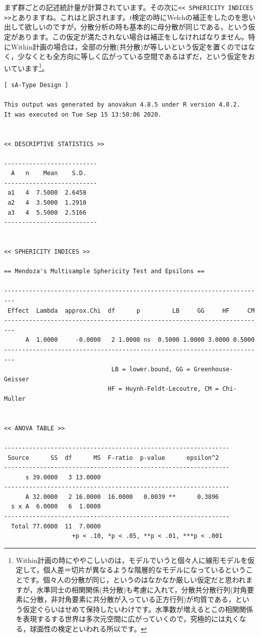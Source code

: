 \documentclass{ltjsarticle}
\begin{document}
まず群ごとの記述統計量が計算されています。その次に\verb|<< SPHERICITY INDICES >>|とありますね。これはと訳されます。$t$検定の時にWelchの補正をしたのを思い出して欲しいのですが，分散分析の時も基本的に母分散が同じである，という仮定があります。この仮定が満たされない場合は補正をしなければなりません。特にWithin計画の場合は，全部の分散(共分散)が等しいという仮定を置くのではなく，少なくとも全方向に等しく広がっている空間であるはずだ，という仮定をおいています\footnote{Within計画の時にややこしいのは，モデルでいうと個々人に線形モデルを仮定して，個人差＝切片が異なるような階層的なモデルになっているということです。個々人の分散が同じ，というのはなかなか厳しい仮定だと思われますが，水準同士の相関関係(共分散)も考慮に入れて，分散共分散行列(対角要素に分散，非対角要素に共分散が入っている正方行列)が均質である，という仮定ぐらいはせめて保持したいわけです。水準数が増えるとこの相関関係を表現するする世界は多次元空間に広がっていくので，究極的には丸くなる，球面性の検定といわれる所以です。 }。
\begin{tcolorbox}
\begin{verbatim}
[ sA-Type Design ]

This output was generated by anovakun 4.8.5 under R version 4.0.2.
It was executed on Tue Sep 15 13:50:06 2020.

 
<< DESCRIPTIVE STATISTICS >>

--------------------------
  A   n    Mean    S.D. 
--------------------------
 a1   4  7.5000  2.6458 
 a2   4  3.5000  1.2910 
 a3   4  5.5000  2.5166 
--------------------------


<< SPHERICITY INDICES >>

== Mendoza's Multisample Sphericity Test and Epsilons ==

-------------------------------------------------------------------------
 Effect  Lambda  approx.Chi  df      p         LB     GG     HF     CM 
-------------------------------------------------------------------------
      A  1.0000     -0.0000   2 1.0000 ns  0.5000 1.0000 3.0000 0.5000 
-------------------------------------------------------------------------
                              LB = lower.bound, GG = Greenhouse-Geisser
                             HF = Huynh-Feldt-Lecoutre, CM = Chi-Muller


<< ANOVA TABLE >>

---------------------------------------------------------------
 Source      SS  df      MS  F-ratio  p-value      epsilon^2 
---------------------------------------------------------------
      s 39.0000   3 13.0000                                  
---------------------------------------------------------------
      A 32.0000   2 16.0000  16.0000   0.0039 **      0.3896 
  s x A  6.0000   6  1.0000                                  
---------------------------------------------------------------
  Total 77.0000  11  7.0000                                  
                   +p < .10, *p < .05, **p < .01, ***p < .001
\end{verbatim}
\end{tcolorbox}
\end{document}
